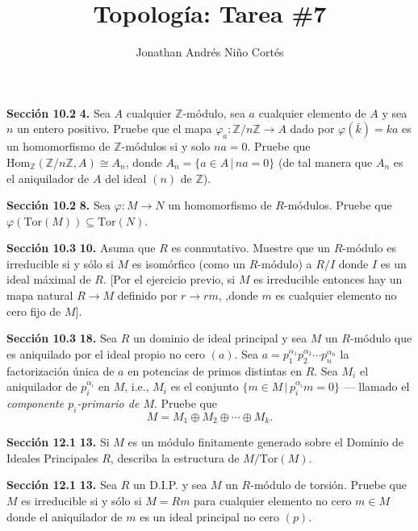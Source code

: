 \documentclass[letter,twoside,12pt]{article}
\title{Topología: Tarea \#7}
\author{Jonathan Andrés Niño Cortés}
\begin{document}
\maketitle
\textbf{Sección 10.2} \textbf{4.} Sea $ A $ cualquier $ \mathbb{Z} $-módulo, sea $ a $ cualquier elemento de $ A $ y sea $ n $ un entero positivo. Pruebe que el mapa $ \varphi_a: \mathbb{Z}/n\mathbb{Z} \to A $ dado por $ \varphi(\overline{k}) = ka $ es un homomorfismo de $ \mathbb{Z} $-módulos si y solo $ na = 0 $. Pruebe que $ \text{Hom}_\mathbb{Z}(\mathbb{Z}/n\mathbb{Z}, A) \cong A_n $, donde $ A_n = \{ a \in A \,|\, na = 0\}$ (de tal manera que $ A_n $ es el aniquilador de $ A $ del ideal $ (n) $ de $ \mathbb{Z} $).

\textbf{Sección 10.2} \textbf{8.} Sea $ \varphi: M \to N $ un homomorfismo de $ R $-módulos. Pruebe que $ \varphi(\text{Tor}(M)) \subseteq \text{Tor}(N)$.

\textbf{Sección 10.3} \textbf{10.} Asuma que $ R $ es conmutativo. Muestre que un $ R $-módulo es irreducible si y sólo si $ M $ es isomórfico (como un $ R $-módulo) a $ R/I $ donde $ I $ es un ideal máximal de $ R $. [Por el ejercicio previo, si $ M $ es irreducible entonces hay un mapa natural $ R \to M  $ definido por $ r \to rm  $, ,donde $ m $ es cualquier elemento no cero fijo de $ M $].

\textbf{Sección 10.3} \textbf{18.}
Sea $ R $ un dominio de ideal principal y sea $ M $ un $ R $-módulo que es aniquilado por el ideal propio no cero $ (a) $. Sea $ a = p_1^{\alpha_1}p_2^{\alpha_2}\cdots p_n^{\alpha_n} $ la factorización única de $ a $ en potencias de primos distintas en $ R $. Sea $ M_i $ el aniquilador de $ p_i^{\alpha_i} $ en $ M $, i.e., $ M_i $ es el conjunto $ \{ m \in M \,|\,p_i^{\alpha_i}m=0 \} $ --- llamado el \textit{componente $ p_i $-primario de $ M $}. Pruebe que
\begin{equation}
M = M_1 \oplus M_2 \oplus \cdots \oplus M_k. \nonumber
\end{equation}

\textbf{Sección 12.1} \textbf{13.} Si $ M $ es un módulo finitamente generado sobre el Dominio de Ideales Principales $ R $, describa la estructura de $ M/\text{Tor}(M) $.

\textbf{Sección 12.1} \textbf{13.} Sea $ R $ un D.I.P. y sea $ M $ un $ R $-módulo de torsión. Pruebe que $ M $ es irreducible si y sólo si $ M = Rm $ para cualquier elemento no cero $ m \in M $ donde el aniquilador de $ m $ es un ideal principal no cero $ (p) $. 
\end{document}
